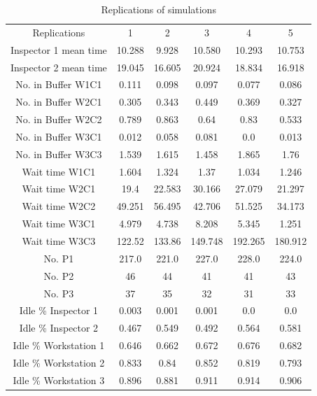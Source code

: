 \documentclass{article}
\begin{document}
\begin{table}[htp]
\caption{Replications of simulations}
\begin{center}
\begin{tabular}{cccccc}
\hline
Replications & 1 & 2 & 3 & 4 & 5\\
Inspector 1 mean time&10.288&9.928&10.580&10.293&10.753\\
Inspector 2 mean time&19.045&16.605&20.924&18.834&16.918\\
No. in Buffer W1C1&0.111&0.098&0.097&0.077&0.086\\
No. in Buffer W2C1&0.305&0.343&0.449&0.369&0.327\\
No. in Buffer W2C2&0.789&0.863&0.64&0.83&0.533\\
No. in Buffer W3C1&0.012&0.058&0.081&0.0&0.013\\
No. in Buffer W3C3&1.539&1.615&1.458&1.865&1.76\\
Wait time W1C1&1.604&1.324&1.37&1.034&1.246\\
Wait time W2C1&19.4&22.583&30.166&27.079&21.297\\
Wait time W2C2&49.251&56.495&42.706&51.525&34.173\\
Wait time W3C1&4.979&4.738&8.208&5.345&1.251\\
Wait time W3C3&122.52&133.86&149.748&192.265&180.912\\
No. P1&217.0&221.0&227.0&228.0&224.0\\
No. P2&46&44&41&41&43\\
No. P3&37&35&32&31&33\\
Idle \% Inspector 1&0.003&0.001&0.001&0.0&0.0\\
Idle \% Inspector 2&0.467&0.549&0.492&0.564&0.581\\
Idle \% Workstation 1&0.646&0.662&0.672&0.676&0.682\\
Idle \% Workstation 2&0.833&0.84&0.852&0.819&0.793\\
Idle \% Workstation 3&0.896&0.881&0.911&0.914&0.906\\
\hline


\end{tabular}




\end{center}
\end{table}
\end{document}
